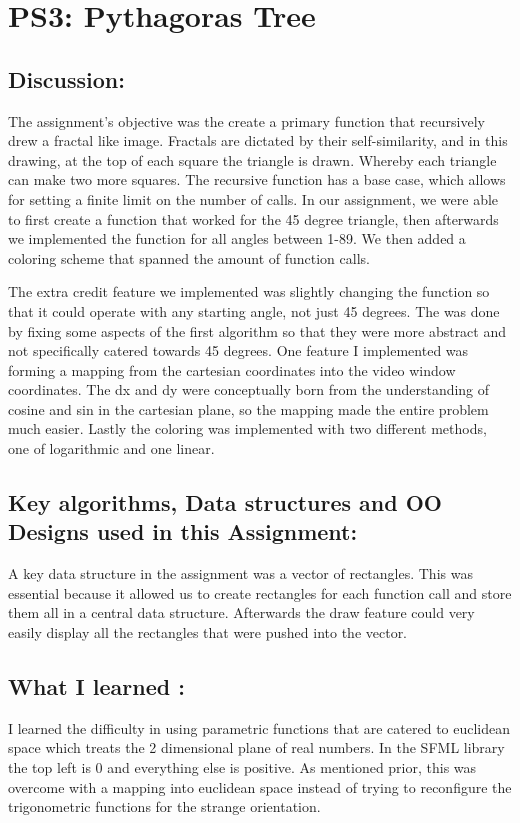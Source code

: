 \section{PS3: Pythagoras Tree}\label{sec:ps3}
\graphicspath{{ps3b}}
\subsection{Discussion:}\label{sec:ps3b:disc}
    The assignment's objective was the create a primary function that recursively drew a fractal like image. Fractals are dictated by their self-similarity, and in this drawing, at the top of each square the triangle is drawn.
Whereby each triangle can make two more squares. The recursive function has a base case, which allows for setting a finite limit on the number of calls. In our assignment, we were able to first create a function that worked for the 45 degree
triangle, then afterwards we implemented the function for all angles between 1-89. We then added a coloring scheme that spanned the amount of function calls. 

The extra credit feature we implemented was slightly changing the function so that it could operate with any starting angle, not just 45 degrees. 
The was done by fixing some aspects of the first algorithm so that they were more abstract and not specifically catered towards 45 degrees. 
One feature I implemented was forming a mapping from the cartesian coordinates into the video window coordinates. The dx and dy were conceptually born from the understanding of cosine and sin in 
the cartesian plane, so the mapping made the entire problem much easier. 
Lastly the coloring was implemented with two different methods, one of logarithmic and one linear. 
\subsection{Key algorithms, Data structures and OO Designs used in this Assignment:}
     A key data structure in the assignment was a vector of rectangles. This was essential because it allowed us to create rectangles for each function call and store them all in a central data structure. 
Afterwards the draw feature could very easily display all the rectangles that were pushed into the vector. 

\subsection{What I learned :}
I learned the difficulty in using parametric functions that are catered to euclidean space which treats the 2 dimensional plane of real numbers. In the SFML library the top left is 0 and everything else is positive. As mentioned prior, this was overcome with a mapping into euclidean space instead of trying to reconfigure the trigonometric functions for the strange orientation. 

